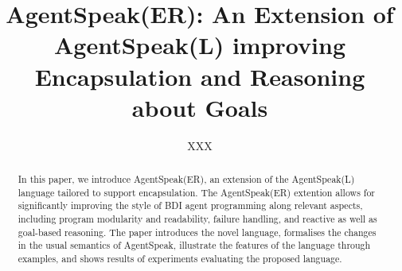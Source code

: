 \documentclass{llncs}
\begin{document}
\title{AgentSpeak(ER): An Extension of AgentSpeak(L) improving
  Encapsulation and Reasoning about Goals}




\author{XXX}

\maketitle

\begin{abstract}  
  In this paper, we introduce AgentSpeak(ER), an extension of the
  AgentSpeak(L) language tailored to support encapsulation. The
  AgentSpeak(ER) extention allows for significantly improving the
  style of BDI agent programming along relevant aspects, including
  program modularity and readability, failure handling, and reactive
  as well as goal-based reasoning. The paper introduces the novel
  language, formalises the changes in the usual semantics of
  AgentSpeak, illustrate the features of the language through
  examples, and shows results of experiments evaluating the proposed
  language.
\end{abstract}








% 








\end{document}
